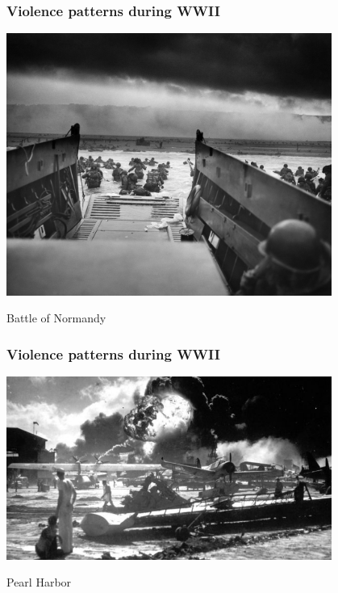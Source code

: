 \documentclass[aspectratio=43]{beamer}
\begin{document}
\begin{frame}
\frametitle{Violence patterns during WWII}
\centering

\includegraphics[width = 0.8\textwidth]{img/wwii-normandy}

Battle of Normandy

\end{frame}

\begin{frame}
\frametitle{Violence patterns during WWII}
\centering

\includegraphics[width = 0.8\textwidth]{img/wwii-pearlharbor}

Pearl Harbor

\end{frame}
\end{document}
